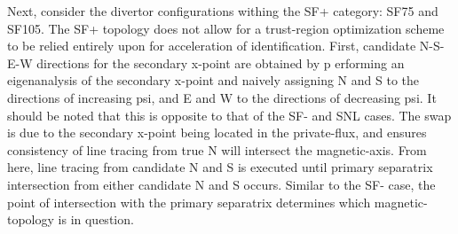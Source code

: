 Next, consider the divertor configurations withing the SF+ category: SF75 and SF105. The SF+ topology does not allow for a trust-region optimization scheme to be relied entirely upon for acceleration of identification. First, candidate N-S-E-W directions for the secondary x-point are obtained by p erforming an eigenanalysis of the secondary x-point and naively assigning N and S to the directions of increasing psi, and E and W to the directions of decreasing psi. It should be noted that this is opposite to that of the SF- and SNL cases. The swap is due to the secondary x-point being located in the private-flux, and ensures consistency of line tracing from true N will intersect the magnetic-axis. From here, line tracing from candidate N and S is executed until primary separatrix intersection from either candidate N and S occurs. Similar to the SF- case, the point of intersection with the primary separatrix determines which magnetic-topology is in question.